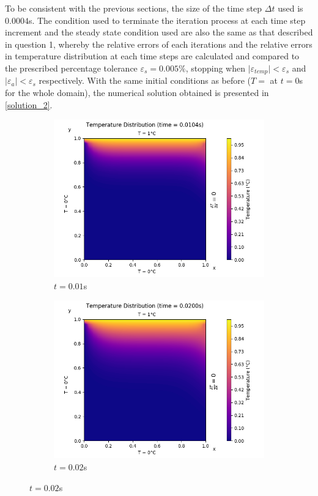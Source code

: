 \documentclass[a4paper]{article}
\begin{document}
	To be consistent with the previous sections, the size of the time step $\Delta t$ used is $0.0004$s. The condition used to terminate the iteration process at each time step increment and the steady state condition used are also the same as that described in question 1, whereby the relative errors of each iterations and the relative errors in temperature distribution at each time steps are calculated and compared to the prescribed percentage tolerance $\varepsilon_s = 0.005\%$, stopping when $\vert \varepsilon_{temp} \vert < \varepsilon_s$ and $\vert \varepsilon_a \vert < \varepsilon_s$ respectively. With the same initial conditions as before ($T=$ at $t=0$s for the whole domain), the numerical solution obtained is presented in \autoref{solution_2}.
	\begin{figure}[H]
		\begin{subfigure}{0.5\textwidth}
			\includegraphics[width=\linewidth]{figures/2/1)t=10ms.png}
			\caption{$t = 0.01$s}
		\end{subfigure}\hspace*{\fill}
		\begin{subfigure}{0.5\textwidth}
			\includegraphics[width=\linewidth]{figures/2/2)t=20ms.png}
			\caption{$t = 0.02$s}
		\end{subfigure}
		

\end{figure}
\end{document}
